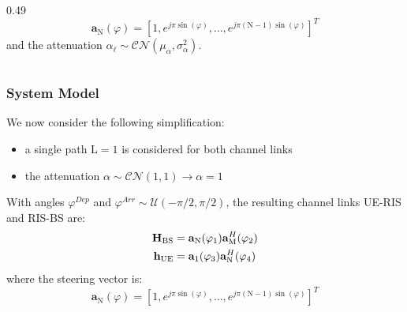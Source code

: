 \documentclass[11pt,aspectratio=1610]{beamer}
\let\phi\varphi
\begin{document}
\begin{frame}
\begin{columns}[T]
\begin{column}{0.49\textwidth}
                \begin{equation*}
                    \mathbf{a}_{\mathrm N}(\phi) = [1,e^{j\pi \sin (\phi)},\ldots, e^{j\pi (\mathrm N-1) \sin (\phi)}]^T
                \end{equation*}
                and the attenuation $\alpha_\ell\sim \mathcal{CN}(\mu_\alpha,\sigma_{\alpha}^2)$.
            \end{column}
    \end{columns}
    \vspace{0.2cm}
    \end{frame}


    \begin{frame}[t]
        \frametitle{System Model}
        \vspace{0.5cm}
        We now consider the following simplification:
        \begin{itemize}
            \item<2-|alert@2> a single path $\mathrm{L} = 1$ is considered for both channel links
            \item<3-|alert@3> the attenuation $\alpha \sim \mathcal{CN}(1,1) \rightarrow \alpha = 1$
        \end{itemize}
        \vspace{0.5cm}
         With angles $\phi^{Dep}$ and $\phi^{Arr} \sim \mathcal{U}(-\pi/2,\pi/2)$, the resulting channel links UE-RIS and RIS-BS are:
        \begin{equation*}
            \begin{split}
                \bold{H}_{\text{BS}} &=  \mathbf{a}_{\mathrm N}(\phi_{1}) \mathbf{a}_{\mathrm M}^{H}(\phi_{2}) \\
                \bold{h}_{\text{UE}} &=  \mathbf{a}_{1}(\phi_{3}) \mathbf{a}_{\mathrm N}^{H}(\phi_{4})
            \end{split}
        \end{equation*}
        where the steering vector is: 
        \vspace{-3mm}
        \begin{equation*}
            \mathbf{a}_{\mathrm N}(\phi) = [1,e^{j\pi \sin (\phi)},\ldots, e^{j\pi (\mathrm N-1) \sin (\phi)}]^T
        \end{equation*}
        \vspace{-0.5mm}
        {\fontsize{5.5}{6.5}}
    \end{frame}
\end{document}
